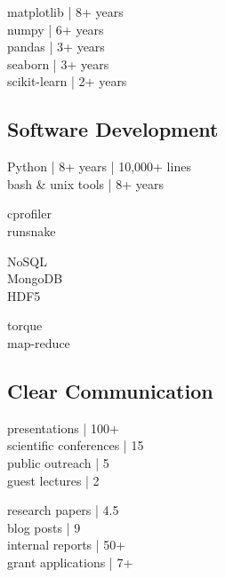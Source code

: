 \documentclass[]{winter-resume-openfont}
\begin{document}
\begin{minipage}[t]{0.3\textwidth}
\textbullet{} matplotlib | 8+ years \\ 
\textbullet{} numpy | 6+ years \\ 
\textbullet{} pandas | 3+ years \\ 
\textbullet{} seaborn | 3+ years \\
\textbullet{} scikit-learn | 2+ years \\
\sectionsep
\sectionsep
\sectionsep


\subsection{Software Development}
\sectionsep

\textbullet{} Python | 8+ years | 10,000+ lines\\
\textbullet{}  bash \& unix tools | 8+ years \\
 \sectionsep

\textbullet{} cprofiler \\ 
\textbullet{} runsnake \\ 
\sectionsep

\textbullet{} NoSQL \\  
\textbullet{} MongoDB \\
\textbullet{} HDF5 \\ 
\sectionsep

\textbullet{} torque \\
\textbullet{} map-reduce \\

\sectionsep
\sectionsep
\sectionsep

\subsection{Clear Communication}
\sectionsep

\textbullet{} presentations | 100+  \\
\textbullet{} scientific conferences | 15 \\
\textbullet{} public outreach | 5 \\
\textbullet{} guest lectures | 2\\
\sectionsep

\textbullet{} research papers | 4.5\\
\textbullet{} blog posts | 9\\ 
\textbullet{} internal reports | 50+\\
\textbullet{} grant applications | 7+ \\


\end{minipage}
\end{document}
